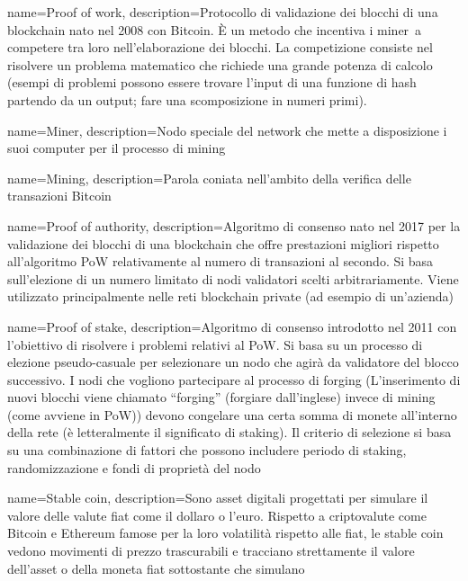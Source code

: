 {
	name={Proof of work},
	description=P{rotocollo di validazione dei blocchi di una blockchain nato nel 2008 con Bitcoin. È un metodo che incentiva i miner\glo\ a competere tra loro nell’elaborazione dei blocchi. La competizione consiste nel risolvere un problema matematico che richiede una grande potenza di calcolo (esempi di problemi possono essere trovare l’input di una funzione di hash partendo da un output; fare una scomposizione in numeri primi).
	}
}

{
	name={Miner},
	description={Nodo speciale del network che mette a disposizione i suoi computer per il processo di mining\glo}
}

{
	name={Mining},
	description={Parola coniata nell’ambito della verifica delle transazioni Bitcoin}
}

{
	name={Proof of authority},
	description={Algoritmo di consenso nato nel 2017 per la validazione dei blocchi di una blockchain che offre prestazioni migliori rispetto all’algoritmo PoW relativamente al numero di transazioni al secondo. Si basa sull’elezione di un numero limitato di nodi validatori scelti arbitrariamente. Viene utilizzato principalmente nelle reti blockchain private (ad esempio di un’azienda)}
}

{
	name={Proof of stake},
	description={Algoritmo di consenso introdotto nel 2011 con l’obiettivo di risolvere i problemi relativi al PoW. Si basa su un processo di elezione pseudo-casuale per selezionare un nodo che agirà da validatore del blocco successivo.  I nodi che vogliono partecipare al processo di forging (L’inserimento di nuovi blocchi viene chiamato “forging” (forgiare dall’inglese) invece di mining (come avviene in PoW)) devono congelare una certa somma di monete all’interno della rete (è letteralmente il significato di staking). Il criterio di selezione si basa su una combinazione di fattori che possono includere periodo di staking, randomizzazione e fondi di proprietà del nodo}
}

{
	name={Stable coin},
	description={Sono asset digitali progettati per simulare il valore delle valute fiat come il dollaro o l'euro. Rispetto a criptovalute come Bitcoin e Ethereum famose per la loro volatilità rispetto alle fiat, le stable coin vedono movimenti di prezzo trascurabili e tracciano strettamente il valore dell'asset o della moneta fiat sottostante che simulano}
}

